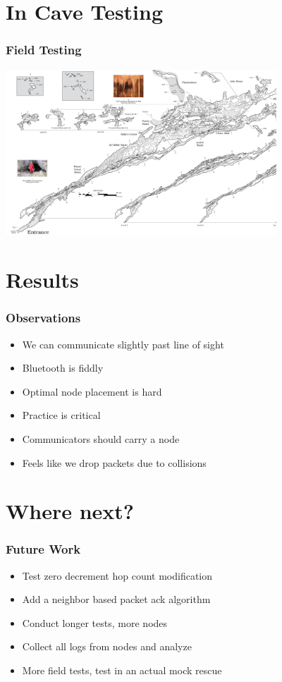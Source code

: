 \documentclass{beamer}
\begin{document}
\section{In Cave Testing}

\begin{frame}
\frametitle{Field Testing}

\begin{center}
\includegraphics[width=4.0in]{../images/New-River-June-4-2024.png}
\end{center}

\end{frame}

\section{Results}

\begin{frame}

\frametitle{Observations}

\begin{itemize}
\item We can communicate slightly past line of sight
\item Bluetooth is fiddly
\item Optimal node placement is hard
\item Practice is critical
\item Communicators should carry a node
\item Feels like we drop packets due to collisions
\end{itemize}

\end{frame}

\section{Where next?}

\begin{frame}
\frametitle{Future Work}

\begin{itemize}
\item Test zero decrement hop count modification
\item Add a neighbor based packet ack algorithm
\item Conduct longer tests, more nodes
\item Collect all logs from nodes and analyze
\item More field tests, test in an actual mock rescue
\end{itemize}

\end{frame}
\end{document}
